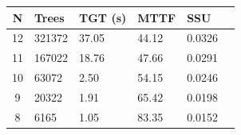 \documentclass[12pt]{article}
\begin{document}
\begin{center}
	\begin{tabular}{| c | lllll |}
    N  & Trees & TGT (s) & MTTF  & SSU    \\ \hline
    12 & 321372  & 37.05   & 44.12 & 0.0326 \\ \hline
    11 & 167022  & 18.76   & 47.66 & 0.0291 \\ \hline
    10 & 63072   & 2.50    & 54.15 & 0.0246 \\ \hline
    9  & 20322   & 1.91    & 65.42 & 0.0198 \\ \hline
    8  & 6165    & 1.05    & 83.35 & 0.0152 \\ \hline
    \end{tabular}
\end{center}




\end{document}
